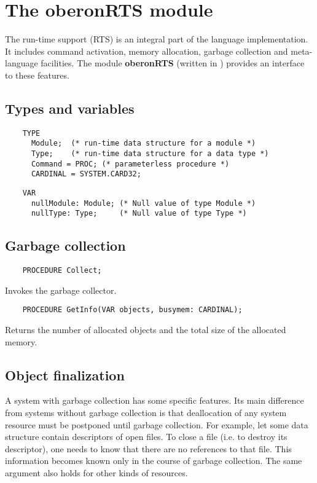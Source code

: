 \section{The oberonRTS module}\label{rts:oberonRTS}

The run-time support (RTS) is an integral part of the \ot{}
language implementation. It includes command activation,
memory allocation, garbage collection and
meta-language facilities.
The module {\bf oberonRTS} (written in \mt{})
provides an interface to these features.

\subsection{Types and variables}
\begin{verbatim}
    TYPE
      Module;  (* run-time data structure for a module *)
      Type;    (* run-time data structure for a data type *)
      Command = PROC; (* parameterless procedure *)
      CARDINAL = SYSTEM.CARD32;
\end{verbatim}

\begin{verbatim}
    VAR
      nullModule: Module; (* Null value of type Module *)
      nullType: Type;     (* Null value of type Type *)
\end{verbatim}

\subsection{Garbage collection}


\verb'    PROCEDURE Collect;'

Invokes the garbage collector.


\verb'    PROCEDURE GetInfo(VAR objects, busymem: CARDINAL);'

Returns the number of allocated objects and the total size
of the allocated memory.

\subsection{Object finalization}

A system with garbage collection has some specific features. Its
main difference from systems without garbage collection
is that deallocation of any system resource must be postponed
until garbage collection. For example, let some data structure
contain descriptors of open files. To  close  a  file  (i.e.
to destroy its descriptor), one needs to know that there are
no references to that file. This information becomes known
only in the course of garbage collection.  The  same  argument
also holds for other kinds of resources.

